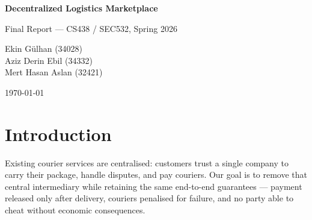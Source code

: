 \documentclass[12pt,a4paper]{article}
\begin{document}
\begin{titlepage}
\centering
\vspace*{2cm}
{\Huge\bfseries Decentralized Logistics Marketplace\par}
\vspace{0.4cm}
{\Large Final Report — CS438 / SEC532, Spring 2026\par}
\vspace{2cm}
{\large
Ekin Gülhan \hspace{0.3cm} (34028) \\[0.3em]
Aziz Derin Ebil \hspace{0.3cm} (34332) \\[0.3em]
Mert Hasan Aslan \hspace{0.3cm} (32421)
\par}
\vspace{1.5cm}
{\large \today\par}
\vspace{3cm}

\begin{abstract}
We present a permissionless, trust-minimised logistics marketplace running on the Ethereum Virtual Machine. Sellers post delivery requests on-chain; couriers compete by placing bids backed by a shared staking pool; an autonomous seller-side agent selects the best bid under on-chain policy limits; a per-delivery escrow vault holds the buyer's payment and releases it only after a sensor-gated mailbox agent confirms physical delivery. The system enforces all critical payment invariants in Solidity — no off-chain party can override them. We document the architecture, on-chain invariants, agent design, security model, test suite, and testnet deployment.
\end{abstract}
\end{titlepage}

\tableofcontents
\newpage

\section{Introduction}

Existing courier services are centralised: customers trust a single company to carry their package, handle disputes, and pay couriers. Our goal is to remove that central intermediary while retaining the same end-to-end guarantees — payment released only after delivery, couriers penalised for failure, and no party able to cheat without economic consequences.
\end{document}
